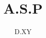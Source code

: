\documentclass[12pt]{article}
\begin{document}
 

\title{A.S.P}
\author{D.XY}
\maketitle

\section{}
\end{document}

